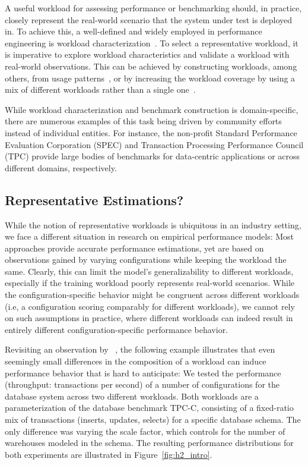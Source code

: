 A useful workload for assessing performance or benchmarking should, in practice, closely represent the real-world scenario that the system under test is deployed in. To achieve this, a well-defined and widely employed in performance engineering is workload characterization~\cite{ceesay2020,papadopoulos2021}. To select a representative workload, it is imperative to explore workload characteristics and validate a workload with real-world observations. This can be achieved by constructing workloads, among others, from usage patterns~\cite{calzarossa2016}, or by increasing the workload coverage by using a mix of different workloads rather than a single one~\cite{jiang2015survey}.

While workload characterization and benchmark construction is domain-specific, there are numerous examples of this task being driven by community efforts instead of individual entities. For instance, the non-profit Standard Performance Evaluation Corporation (SPEC) and Transaction Processing Performance Council (TPC) provide large bodies of benchmarks for data-centric applications or across different domains, respectively.

\subsection{Representative Estimations?}\label{sec:generalizability}
While the notion of representative workloads is ubiquitous in an industry setting, we face a different situation in research on empirical performance models: Most approaches provide accurate performance estimations, yet are based on observations gained by varying configurations while keeping the workload the same. Clearly, this can limit the model's generalizability to different workloads, especially if the training workload poorly represents real-world scenarios. While the configuration-specific behavior might be congruent across different workloads (i.e, a configuration scoring comparably for different workloads), we cannot rely on such assumptions in practice, where different workloads can indeed result in entirely different configuration-specific performance behavior.

Revisiting an observation by \citeauthor{alves_sampling_2020}~\cite{alves_sampling_2020}, the following example illustrates that even seemingly small differences in the composition of a workload can induce performance behavior that is hard to anticipate: We tested the performance (throughput: transactions per second) of a number of configurations for the database system \htwo across two different workloads. Both workloads are a parameterization of the database benchmark \textsf{TPC-C}, consisting of a fixed-ratio mix of transactions (inserts, updates, selects) for a specific database schema. The only difference was varying the scale factor, which controls for the number of warehouses modeled in the schema. The resulting performance distributions for both experiments are illustrated in Figure~\ref{fig:h2_intro}.

